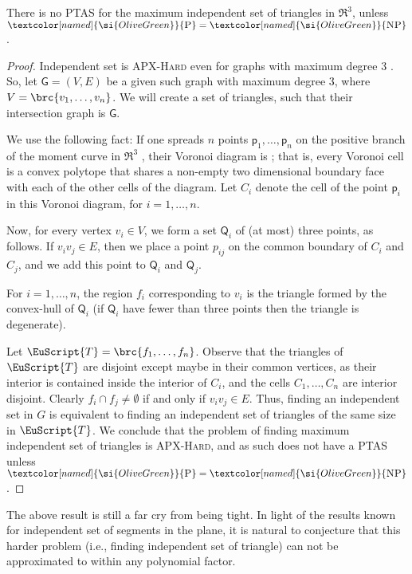 \documentclass[12pt]{article}
\newcommand{\PntSet}{{\mathsf{Q}}}
\newcommand{\Graph}{\mathsf{G}}
\newcommand{\TriSet}{\EuScript{T}}
\providecommand{\ComplexityClass}[1]{{{\textcolor[named]{\si{OliveGreen}}{\textsc{#1}}}}}
\providecommand{\APXHard}{{\ComplexityClass{\si{APX}-Hard}}\xspace}
\providecommand{\NP}{\ComplexityClass{NP}\xspace}
\providecommand{\POLYT}{\ComplexityClass{P}\xspace}
\providecommand{\PTAS}{\textsf{\si{PTAS}}\xspace}
\newcommand{\pnt}{\mathsf{p}}
\begin{document}
\begin{lemma}
    There is no \PTAS for the maximum independent set of triangles in
    $\Re^3$, unless $\POLYT=\NP$.
\end{lemma}

\begin{proof}
    Independent set is \APXHard even for graphs with maximum degree
    $3$ \cite{acgkm-ca-99}. So, let $\Graph=(V,E)$ be a given such
    graph with maximum degree $3$, where $V = \brc{v_1,\ldots,
       v_n}$. We will create a set of triangles, such that their
    intersection graph is $\Graph$.

    We use the following fact: If one spreads $n$ points
    $\pnt_1,\ldots, \pnt_n$ on the positive branch of the moment curve
    in $\Re^3$ \cite{s-eubnf-91, ek-alnfc-03}, their Voronoi diagram
    is ; that is, every Voronoi cell is a convex
    polytope that shares a non-empty two dimensional boundary face
    with each of the other cells of the diagram. Let $C_i$ denote the
    cell of the point $\pnt_i$ in this Voronoi diagram, for
    $i=1,\ldots, n$.

    Now, for every vertex $v_i \in V$, we form a set $\PntSet_i$ of
    (at most) three points, as follows. If $v_iv_j \in E$, then we
    place a point $p_{ij}$ on the common boundary of $C_i$ and $C_j$,
    and we add this point to $\PntSet_i$ and $\PntSet_j$.
    
    For $i=1,\ldots, n$, the region $f_i$ corresponding to $v_i$ is
    the triangle formed by the convex-hull of $\PntSet_i$ (if
    $\PntSet_i$ have fewer than three points then the triangle is
    degenerate).

    Let $\TriSet = \brc{f_1,\ldots, f_n}$.  Observe that the triangles
    of $\TriSet$ are disjoint except maybe in their common vertices,
    as their interior is contained inside the interior of $C_i$, and
    the cells $C_1, \ldots, C_n$ are interior disjoint. Clearly $f_i
    \cap f_j \ne \emptyset$ if and only if $v_iv_j \in E$. Thus,
    finding an independent set in $G$ is equivalent to finding an
    independent set of triangles of the same size in $\TriSet$. We
    conclude that the problem of finding maximum independent set of
    triangles is \APXHard, and as such does not have a \PTAS unless
    $\POLYT=\NP$.
\end{proof}

\bigskip

The above result is still a far cry from being tight. In light of the
results known \cite{am-isigc-06} for independent set of segments in
the plane, it is natural to conjecture that this harder problem (i.e.,
finding independent set of triangle) can not be approximated to within
any polynomial factor.
\end{document}
